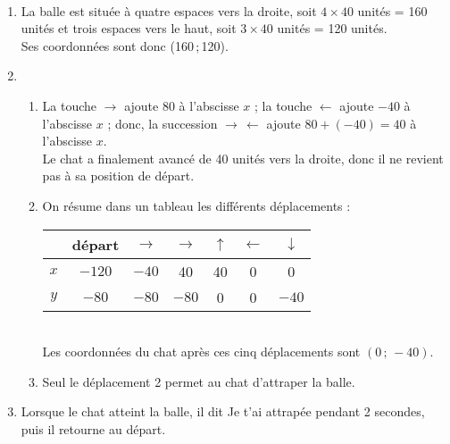    \ \\ [-5mm]
   \begin{enumerate}
      \item La balle est située à quatre espaces vers la droite, soit $4\times40$ unités = 160 unités et trois espaces vers le haut, soit $3\times40$ unités = 120 unités. \\
      Ses coordonnées sont donc {\blue (160\,;\,120)}.
      \item \\
      \begin{enumerate}
         \item La touche $\to$ ajoute 80 à l'abscisse $x$ ; la touche $\gets$ ajoute $-40$ à l'abscisse $x$ ; donc, la succession $\to \, \gets$ ajoute $80+(-40) =40$ à l'abscisse $x$. \\
         Le chat a finalement \og avancé \fg{} de 40 unités vers la droite, donc {\blue il ne revient pas à sa position de départ}.
         \item On résume dans un tableau les différents déplacements : \\ \medskip
            {
            \begin{tabular}{|*{7}{C{1}|}}
               \hline
               & départ & $\to$ & $\to$ & $\uparrow$ & $\gets$ & $\downarrow$ \\
               \hline
               $x$ & $-120$ & $-40$ & 40 & 40 & 0 & 0 \\
               \hline
               $y$ & $-80$ & $-80$ & $-80$ & 0 & 0 & $-40$ \\
               \hline
            \end{tabular}} \\ \medskip
         Les coordonnées du chat après ces cinq déplacements sont {\blue $(0\,;\,-40)$}.
         \item Seul le {\blue déplacement 2} permet au chat d'attraper la balle.
      \end{enumerate}
      \setcounter{enumi}{2}
      \item Lorsque le chat atteint la balle, {\blue il dit \og Je t'ai attrapée \fg{} pendant 2 secondes}, puis il retourne au départ.
   \end{enumerate}
